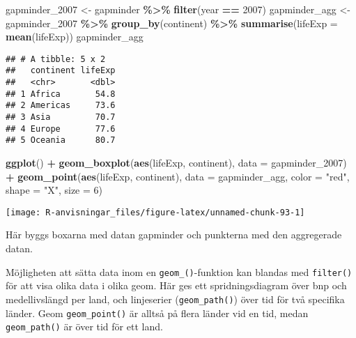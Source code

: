 \documentclass[
]{book}
\newenvironment{Shaded}{\begin{snugshade}}{\end{snugshade}}
\newcommand{\AttributeTok}[1]{\textcolor[rgb]{0.13,0.29,0.53}{#1}}
\newcommand{\DecValTok}[1]{\textcolor[rgb]{0.00,0.00,0.81}{#1}}
\newcommand{\FunctionTok}[1]{\textcolor[rgb]{0.13,0.29,0.53}{\textbf{#1}}}
\newcommand{\NormalTok}[1]{#1}
\newcommand{\OtherTok}[1]{\textcolor[rgb]{0.56,0.35,0.01}{#1}}
\newcommand{\SpecialCharTok}[1]{\textcolor[rgb]{0.81,0.36,0.00}{\textbf{#1}}}
\newcommand{\StringTok}[1]{\textcolor[rgb]{0.31,0.60,0.02}{#1}}
\theoremstyle{definition}
\theoremstyle{definition}
\theoremstyle{definition}
\theoremstyle{definition}
\theoremstyle{remark}
\begin{document}
\begin{Shaded}
\begin{Highlighting}[]
\NormalTok{gapminder\_2007 }\OtherTok{\textless{}{-}}\NormalTok{ gapminder }\SpecialCharTok{\%\textgreater{}\%} \FunctionTok{filter}\NormalTok{(year }\SpecialCharTok{==} \DecValTok{2007}\NormalTok{)}
\NormalTok{gapminder\_agg }\OtherTok{\textless{}{-}}\NormalTok{ gapminder\_2007 }\SpecialCharTok{\%\textgreater{}\%} 
  \FunctionTok{group\_by}\NormalTok{(continent) }\SpecialCharTok{\%\textgreater{}\%} 
  \FunctionTok{summarise}\NormalTok{(}\AttributeTok{lifeExp =} \FunctionTok{mean}\NormalTok{(lifeExp))}
\NormalTok{gapminder\_agg}
\end{Highlighting}
\end{Shaded}

\begin{verbatim}
## # A tibble: 5 x 2
##   continent lifeExp
##   <chr>       <dbl>
## 1 Africa       54.8
## 2 Americas     73.6
## 3 Asia         70.7
## 4 Europe       77.6
## 5 Oceania      80.7
\end{verbatim}

\begin{Shaded}
\begin{Highlighting}[]
\FunctionTok{ggplot}\NormalTok{() }\SpecialCharTok{+}
  \FunctionTok{geom\_boxplot}\NormalTok{(}\FunctionTok{aes}\NormalTok{(lifeExp, continent), }\AttributeTok{data =}\NormalTok{ gapminder\_2007) }\SpecialCharTok{+}
  \FunctionTok{geom\_point}\NormalTok{(}\FunctionTok{aes}\NormalTok{(lifeExp, continent), }\AttributeTok{data =}\NormalTok{ gapminder\_agg, }\AttributeTok{color =} \StringTok{"red"}\NormalTok{, }\AttributeTok{shape =} \StringTok{"X"}\NormalTok{, }\AttributeTok{size =} \DecValTok{6}\NormalTok{)}
\end{Highlighting}
\end{Shaded}

\begin{center}\texttt{[image: R-anvisningar\_files/figure-latex/unnamed-chunk-93-1]} \end{center}

Här byggs boxarna med datan gapminder och punkterna med den aggregerade datan.

Möjligheten att sätta data inom en \texttt{geom\_()}-funktion kan blandas med \texttt{filter()} för att visa olika data i olika geom. Här ges ett spridningsdiagram över bnp och medellivslängd per land, och linjeserier (\texttt{geom\_path()}) över tid för två specifika länder. Geom \texttt{geom\_point()} är alltså på flera länder vid en tid, medan \texttt{geom\_path()} är över tid för ett land.
\end{document}
